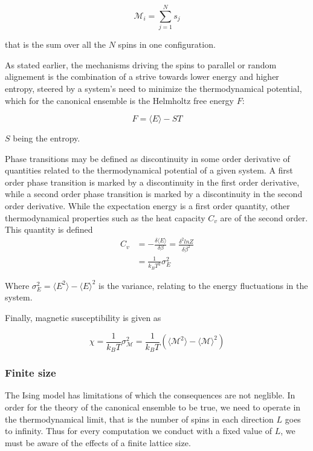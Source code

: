 \documentclass[norsk, 10pt, twocolumn, a4paper]{revtex4}
\begin{document}
\begin{equation}
    \label{eq:Mi}
    \mathscr{M}_i = \sum_{j=1}^N s_j
\end{equation}

that is the sum over all the $N$ spins in one configuration.

As stated earlier, the mechanisms driving the spins to parallel or random alignement is the combination of a strive
towards lower energy and higher entropy,
steered by a system's need to minimize the thermodynamical potential, which for the canonical ensemble is
the Helmholtz free energy $F$:

\begin{equation}
    \label{eq:F}
    F = \langle E \rangle - ST
\end{equation}

$S$ being the entropy.

Phase transitions may be defined as discontinuity in some order derivative of quantities related to the
thermodynamical potential of a given system.
A first order phase transition is marked by a discontinuity in the first order derivative, while a second order
phase transition is marked by a discontinuity in the second order derivative. While the expectation energy is
a first order quantity,
other thermodynamical properties such as the heat capacity $C_v$ are of the second order. This quantity is defined
\begin{align}
    \label{eq:Cv}
    C_v & = - \frac{\delta \langle E \rangle}{\delta\beta} = \frac{\delta^2 lnZ}{\delta\beta^2} \\
        & = \frac{1}{k_BT^2}\sigma_E^2
\end{align}

Where $\sigma_E^2 = \langle E^2 \rangle - \langle E \rangle^2$ is the variance, relating to
the energy fluctuations in the system.

Finally, magnetic susceptibility is given as

\begin{equation}
    \label{eq:chi}
    \chi = \frac{1}{k_BT} \sigma_{\mathscr{M}}^2= \frac{1}{k_BT}(\langle\mathscr{M}^2\rangle - \langle\mathscr{M}\rangle^2)
\end{equation}


\subsubsection{Finite size}
The Ising model has limitations of which the consequences are not neglible. In order for the theory of the canonical ensemble
to be true, we need to operate in the thermodynamical limit, that is the number of spins in each direction $L$
goes to infinity. Thus for every computation we conduct with a fixed value of $L$, we must be aware of the effects of a finite
lattice size.
\end{document}
